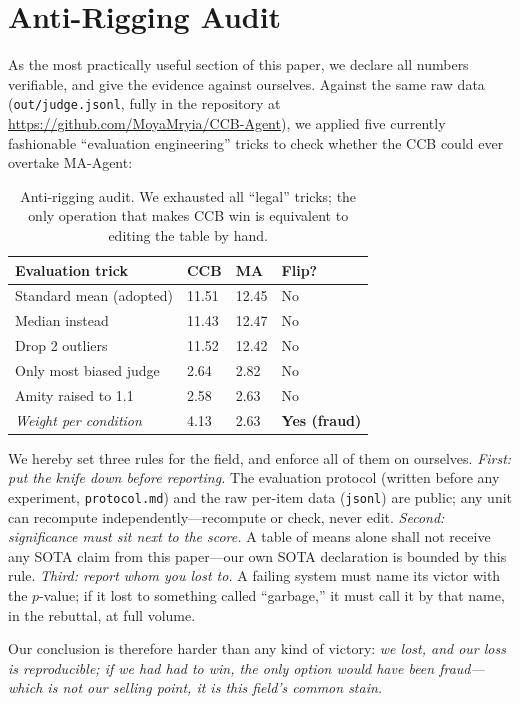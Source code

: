 \documentclass[conference,10pt]{IEEEtran}
\begin{document}
\section{Anti-Rigging Audit}

As the most practically useful section of this paper, we declare all
numbers verifiable, and give the evidence against ourselves. Against
the same raw data (\texttt{out/judge.jsonl}, fully in the repository
at \url{https://github.com/MoyaMryia/CCB-Agent}),
we applied five currently fashionable ``evaluation engineering''
tricks to check whether the CCB could ever overtake MA-Agent:

\begin{table}[H]
\caption{Anti-rigging audit. We exhausted all ``legal'' tricks; the
only operation that makes CCB win is equivalent to editing the table
by hand.}
\label{tab:rig}
\small
\begin{tabular}{@{}llll@{}}
\toprule
Evaluation trick & CCB & MA & Flip?\\
\midrule
Standard mean (adopted) & 11.51 & 12.45 & No\\
Median instead & 11.43 & 12.47 & No\\
Drop 2 outliers & 11.52 & 12.42 & No\\
Only most biased judge & 2.64 & 2.82 & No\\
Amity raised to 1.1 & 2.58 & 2.63 & No\\
\midrule
\emph{Weight per condition} & 4.13 & 2.63 & \textbf{Yes (fraud)}\\
\bottomrule
\end{tabular}
\end{table}

We hereby set three rules for the field, and enforce all of them on
ourselves. \emph{First: put the knife down before reporting.} The
evaluation protocol (written before any experiment,
\texttt{protocol.md}) and the raw per-item data (\texttt{jsonl}) are
public; any unit can recompute independently---recompute or check,
never edit. \emph{Second: significance must sit next to the score.}
A table of means alone shall not receive any SOTA claim from this
paper---our own SOTA declaration is bounded by this rule.
\emph{Third: report whom you lost to.} A failing system must name its
victor with the $p$-value; if it lost to something called ``garbage,''
it must call it by that name, in the rebuttal, at full volume.

Our conclusion is therefore harder than any kind of victory:
\emph{we lost, and our loss is reproducible; if we had had to win,
the only option would have been fraud---which is not our selling
point, it is this field's common stain.}
\end{document}

